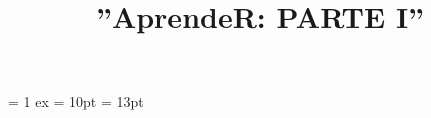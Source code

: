 \usepackage{booktabs}%
\usepackage{amsthm}%
\usepackage{ifplatform} %
\usepackage[spanish]{babel} %
\makeatletter
\def\thm@space@setup{%
  \thm@preskip=8pt plus 2pt minus 4pt
  \thm@postskip=\thm@preskip
}
\makeatother
\graphicspath{{_bookdown_files/}} %
  
\title{''AprendeR: PARTE I''}
\usepackage{makeidx}
\makeindex



\usepackage[utf8]{inputenc}
\usepackage[T1]{fontenc}   
\usepackage[usenames,dvipsnames]{color}
\usepackage{xcolor}

\setlength{\textwidth}{17cm}
\setlength{\textheight}{24.5cm}
\setlength{\evensidemargin}{-0.4cm}
\setlength{\oddsidemargin}{-0.4cm}
\setlength{\topmargin}{-2cm}
\parskip= 1 ex
\parindent = 10pt
\baselineskip= 13pt
%
%
\setlength{\footnotesep}{3ex}
\usepackage[hang,flushmargin]{footmisc} 
\makeatletter{}
 \makeatother 
\renewcommand{\hangfootparskip}{1ex}
\renewcommand{\hangfootparindent}{0pt}  
\newenvironment{tightcenter}{%
  \setlength\topsep{3pt}
  \setlength\parskip{3pt}
  \begin{center}
}{%
  \end{center}
}
\newenvironment{tightquote}{%
  \setlength\topsep{3pt}
  \setlength\parskip{3pt}
  \begin{quote}
}{%
  \end{quote}
}
 
\newcommand{\red}[1]{\textcolor{red}{#1}}
\newcommand{\green}[1]{\textcolor{green}{#1}}
\newcommand{\blue}[1]{\textcolor{blue}{#1}}
\newcommand{\gray}[1]{\textcolor{gray}{#1}}

